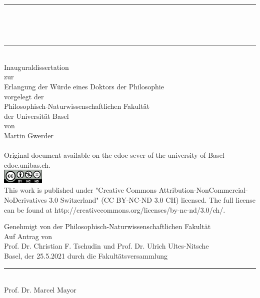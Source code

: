 \begin{titlepage}
\begin{center}
\newcommand{\HRule}{\rule{\linewidth}{0.5mm}}
\HRule \\[0.4cm]
{ \huge \bfseries \makeatletter\@title\par\normalsize\@subtitle\makeatother \\[0.4cm] }

\HRule \\[3.0cm]

{\large Inauguraldissertation}\\
zur\\
Erlangung der Würde eines Doktors der Philosophie\\
vorgelegt der\\
Philosophisch-Naturwissenschaftlichen Fakultät\\
der Universität Basel\\
von\\
Martin Gwerder\\
\vfill
{\large \the\year \\[1cm]}
{\footnotesize Original document available on the edoc sever of the university of Basel edoc.unibas.ch.\\[0.5cm]
\includegraphics[height=7mm]{./inc/cclic.png}~\\[0.5cm]This work is published under  "Creative Commons Attribution-NonCommercial-NoDerivatives 3.0 Switzerland" (CC BY-NC-ND 3.0 CH) licensed. The full license can be found at http://creativecommons.org/licenses/by-nc-nd/3.0/ch/.}

\end{center}
\end{titlepage}

\onecolumn
\clearpage\pagestyle{plain}

\begin{center}

Genehmigt von der Philosophisch-Naturwissenschaftlichen Fakult\"at\\
Auf Antrag von\\[0.5cm]
Prof. Dr. Christian F. Tschudin und Prof. Dr. Ulrich Ultes-Nitsche\\[0.5cm]

Basel, der 25.5.2021 durch die Fakultätsversammlung\\[2cm]
{\rule{6cm}{0.2pt}\\ Prof. Dr. Marcel Mayor}
\end{center}
\clearpage



